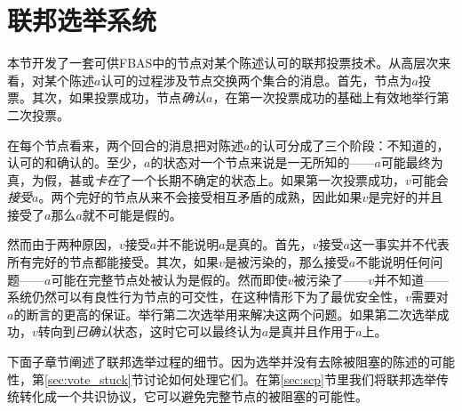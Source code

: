 \section{联邦选举系统}\label{sec:voting}

本节开发了一套可供FBAS中的节点对某个陈述认可的联邦投票技术。从高层次来看，对某个陈述$a$认可的过程涉及节点交换两个集合的消息。首先，节点为$a$投票。其次，如果投票成功，节点\textit{确认}$a$，在第一次投票成功的基础上有效地举行第二次投票。

在每个节点看来，两个回合的消息把对陈述$a$的认可分成了三个阶段：不知道的，认可的和确认的。至少，$a$的状态对一个节点来说是一无所知的——$a$可能最终为真，为假，甚或\textit{卡在}了一个长期不确定的状态上。如果第一次投票成功，$v$可能会\textit{接受}$a$。两个完好的节点从来不会接受相互矛盾的成熟，因此如果$v$是完好的并且接受了$a$那么$a$就不可能是假的。

然而由于两种原因，$v$接受$a$并不能说明$a$是真的。首先，$v$接受$a$这一事实并不代表所有完好的节点都能接受。其次，如果$v$是被污染的，那么接受$a$不能说明任何问题——$a$可能在完整节点处被认为是假的。然而即使$v$被污染了——$v$并不知道——系统仍然可以有良性行为节点的{\quorum}可交性，在这种情形下为了最优安全性，$v$需要对$a$的断言的更高的保证。举行第二次选举用来解决这两个问题。如果第二次选举成功，$v$转向到\textit{已确认}状态，这时它可以最终认为$a$是真并且作用于$a$上。

下面子章节阐述了联邦选举过程的细节。因为选举并没有去除被阻塞的陈述的可能性，第\ref{sec:vote_stuck}节讨论如何处理它们。在第\ref{sec:scp}节里我们将联邦选举传统转化成一个共识协议，它可以避免完整节点的被阻塞{\slot}的可能性。






